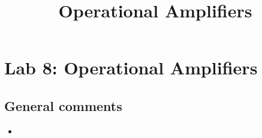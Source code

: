 \documentclass{article}
\title{Operational Amplifiers}
\begin{document}
\maketitle

\section{Lab 8: Operational Amplifiers}

\subsection*{General comments}

\begin{itemize}
\item
\end{itemize}
\end{document}
